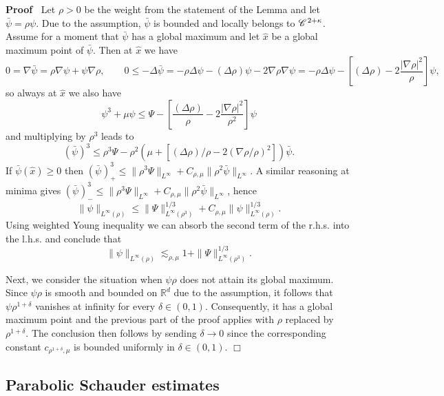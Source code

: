\documentclass[a4paper,11pt]{article}
\renewcommand{\geq}{\geqslant}
\newenvironment{proof}{\noindent\textbf{Proof\ }}{\hspace*{\fill}$\Box$\medskip}
\numberwithin{equation}{section}
\newcommand{\CC}{\mathscr{C} \hspace{.1em}}
\newcommand{\R}{\mathbb{R}}
\newcommand{\8}{\infty}
\begin{document}
\begin{proof}
Let $\rho > 0$ be the weight from the statement of the Lemma and let $\bar{\psi} = \rho \psi$. Due to the assumption, $\bar{\psi}$ is bounded and locally belongs  to $\CC^{2+\kappa}$. 
  Assume for a moment that $\bar{\psi}$ has a global maximum and let $\hat{x}$
  be a global maximum point of $\bar{\psi}$. Then at $\hat{x}$ we have
  \[ 0 = \nabla \bar{\psi} = \rho \nabla \psi + \psi \nabla \rho, \qquad 0
     \leqslant - \Delta \bar{\psi} = - \rho \Delta \psi - (\Delta \rho) \psi -
     2 \nabla \rho \nabla \psi = - \rho \Delta \psi - \left[ (\Delta \rho) - 2
     \frac{| \nabla \rho |^2}{\rho} \right] \psi, \]
  so always at $\hat{x}$ we also have
  \begin{equation*}%
   \psi^3 + \mu \psi \leqslant \Psi - \left[ \frac{(\Delta \rho)}{\rho} - 2
     \frac{| \nabla \rho |^2}{\rho^2} \right] \psi 
  \end{equation*}
and  multiplying by $\rho^3$ leads to
  \[ (\bar{\psi})^3 \leqslant \rho^3 \Psi - \rho^2 (\mu + [(\Delta \rho) /
     \rho - 2 (\nabla \rho / \rho)^2]) \bar{\psi}. \]
If $\bar{\psi}(\hat{ x})\geq 0$     then
  $(\bar{\psi}^{})_+^3 \leqslant \| \rho^3 \Psi
  \|_{L^{\infty}} + C_{\rho,\mu} \| \rho^2 \bar{\psi} \|_{L^{\infty}}$. A similar
  reasoning at minima gives  $(\bar{\psi}^{})_-^3 \leqslant \| \rho^3 \Psi
  \|_{L^{\infty}} + C_{\rho,\mu} \| \rho^2 \bar{\psi} \|_{L^{\infty}}$, hence
  \[ \| \psi \|_{L^{\infty} (\rho)} \leqslant \| \Psi \|_{L^{\infty}
     (\rho^3)}^{1 / 3} + C_{\rho,\mu} \| \psi \|_{L^{\infty} (\rho)}^{1 / 3} .
  \]
Using weighted Young inequality we can absorb the second term of the r.h.s. into the l.h.s. and conclude that
  \[ \| \psi \|_{L^{\infty} (\rho)} \lesssim_{\rho,\mu} 1 + \| \Psi \|_{L^{\infty}
     (\rho^3)}^{1 / 3} . \]

Next, we consider the situation when $\psi\rho$ does not attain its global maximum. Since $\psi\rho$ is smooth and  bounded on $\R^{d}$ due to the assumption, it follows that  $\psi\rho^{1+\delta}$ vanishes at infinity for every $\delta\in (0,1)$. Consequently, it has a global maximum point and the previous part of the proof applies with $\rho$ replaced by $\rho^{1+\delta}$. The conclusion then follows by sending $\delta\to 0$ since the corresponding constant $c_{\rho^{1+\delta},\mu}$ is bounded uniformly in $\delta\in (0,1).$
%
%
\end{proof}



\subsection{Parabolic Schauder estimates}
\end{document}
